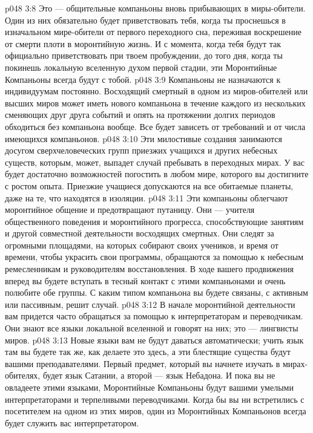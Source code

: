 \vs p048 3:8 \pc {}\bibnobreakspace {} Это --- общительные компаньоны вновь прибывающих в миры\hyp{}обители. Один из них обязательно будет приветствовать тебя, когда ты проснешься в изначальном мире\hyp{}обители от первого переходного сна, переживая воскрешение от смерти плоти в моронтийную жизнь. И с момента, когда тебя будут так официально приветствовать при твоем пробуждении, до того дня, когда ты покинешь локальную вселенную духом первой стадии, эти Моронтийные Компаньоны всегда будут с тобой.
\vs p048 3:9 Компаньоны не назначаются к индивидуумам постоянно. Восходящий смертный в одном из миров\hyp{}обителей или высших миров может иметь нового компаньона в течение каждого из нескольких сменяющих друг друга событий и опять на протяжении долгих периодов обходиться без компаньона вообще. Все будет зависеть от требований и от числа имеющихся компаньонов.
\vs p048 3:10 \pc {}\bibnobreakspace {} Эти милостивые создания занимаются досугом сверхчеловеческих групп приезжих учащихся и других небесных существ, которым, может, выпадет случай пребывать в переходных мирах. У вас будет достаточно возможностей погостить в любом мире, которого вы достигните с ростом опыта. Приезжие учащиеся допускаются на все обитаемые планеты, даже на те, что находятся в изоляции.
\vs p048 3:11 \pc {}\bibnobreakspace {} Эти компаньоны облегчают моронтийное общение и предотвращают путаницу. Они --- учителя общественного поведения и моронтийного прогресса, способствующие занятиям и другой совместной деятельности восходящих смертных. Они следят за огромными площадями, на которых собирают своих учеников, и время от времени, чтобы украсить свои программы, обращаются за помощью к небесным ремесленникам и руководителям восстановления. В ходе вашего продвижения вперед вы будете вступать в тесный контакт с этими компаньонами и очень полюбите обе группы. С каким типом компаньона вы будете связаны, с активным или пассивным, решит случай.
\vs p048 3:12 \pc {}\bibnobreakspace {} В начале моронтийной деятельности вам придется часто обращаться за помощью к интерпретаторам и переводчикам. Они знают все языки локальной вселенной и говорят на них; это --- лингвисты миров.
\vs p048 3:13 Новые языки вам не будут даваться автоматически; учить язык там вы будете так же, как делаете это здесь, а эти блестящие существа будут вашими преподавателями. Первый предмет, который вы начнете изучать в мирах\hyp{}обителях, будет язык Сатании, а второй --- язык Небадона. И пока вы не овладеете этими языками, Моронтийные Компаньоны будут вашими умелыми интерпретаторами и терпеливыми переводчиками. Когда бы вы ни встретились с посетителем на одном из этих миров, один из Моронтийных Компаньонов всегда будет служить вас интерпретатором.
